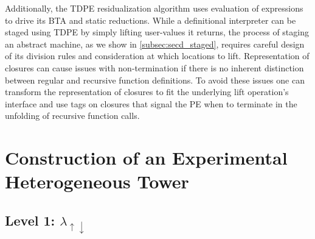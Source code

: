 \documentclass[a4paper,12pt,twoside,openright]{report}
\theoremstyle{definition}
\newcommand{\mslang}{$\lambda_{\uparrow\downarrow}$}
\begin{document}
Additionally, the TDPE residualization algorithm uses evaluation of expressions to drive its BTA and static reductions. While a definitional interpreter can be staged using TDPE by simply lifting user-values it returns, the process of staging an abstract machine, as we show in \ref{subsec:secd_staged}, requires careful design of its division rules and consideration at which locations to lift. Representation of closures can cause issues with non-termination if there is no inherent distinction between regular and recursive function definitions. To avoid these issues one can transform the representation of closures to fit the underlying lift operation's interface and use tags on closures that signal the PE when to terminate in the unfolding of recursive function calls.





\section{Construction of an Experimental Heterogeneous Tower}
\subsection{Level 1: \texorpdfstring{\mslang}{Lg}}\label{sec:mslang}
\end{document}

